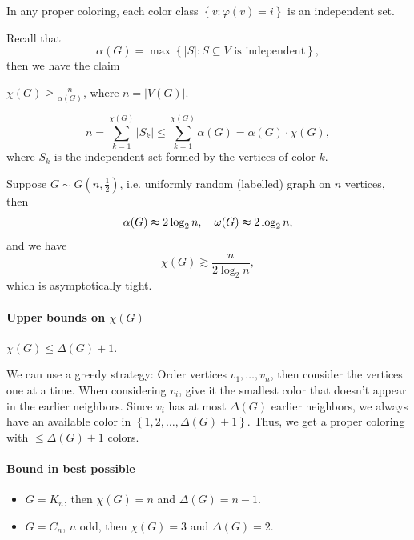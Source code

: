 \begin{observation}
    In any proper coloring, each color class \(\left\{ v: \varphi (v) = i \right\} \) is an independent set.  
\end{observation}

Recall that 
\[
    \alpha (G) = \max \left\{ \vert S \vert: S \subseteq V \text{ is independent}   \right\}, 
\]
then we have the claim 
\begin{claim}
    \(\chi (G) \ge \frac{n}{\alpha (G)}\), where \(n = \vert V(G) \vert \).
\end{claim}
\begin{explanation}
    \[
        n = \sum_{k=1}^{\chi(G)} \vert S_k \vert \le \sum_{k=1}^{\chi(G)} \alpha (G) = \alpha (G) \cdot \chi(G),   
    \]
    where \(S_k\) is the independent set formed by the vertices of color \(k\).  
\end{explanation}

\begin{remark}
    Suppose \(G \sim G \left( n, \frac{1}{2} \right) \), i.e. uniformly random (labelled) graph on \(n\) vertices, then 
    \[
        \alpha (G) \thickapprox 2 \log _2 n, \quad \omega (G) \thickapprox 2\log _2 n,
    \]  
    and we have 
    \[
        \chi (G) \gtrsim \frac{n}{2 \log _2 n},
    \]
    which is asymptotically tight.
\end{remark}

\paragraph{Upper bounds on \(\chi (G)\)}

\begin{claim}
    \(\chi (G) \le \Delta (G) + 1\).  
\end{claim}

\begin{explanation}
    We can use a greedy strategy: Order vertices \(v_1, \dots , v_n\), then consider the vertices one at a time. When considering \(v_i\), give it the smallest color that doesn't appear in the earlier neighbors. Since \(v_i\) has at most \(\Delta (G)\) earlier neighbors, we always have an available color in \(\left\{ 1, 2, \dots , \Delta (G) + 1 \right\} \). Thus, we get a proper coloring with \(\le \Delta (G) + 1\) colors.      
\end{explanation}

\paragraph{Bound in best possible}
\begin{eg}
    \hfill 
    \begin{itemize}
        \item \(G = K_n\), then \(\chi (G) = n\) and \(\Delta(G) = n - 1\).
        \item \(G = C_n\), \(n\) odd, then \(\chi (G) = 3\) and \(\Delta (G) = 2\).    
    \end{itemize}   
\end{eg}

